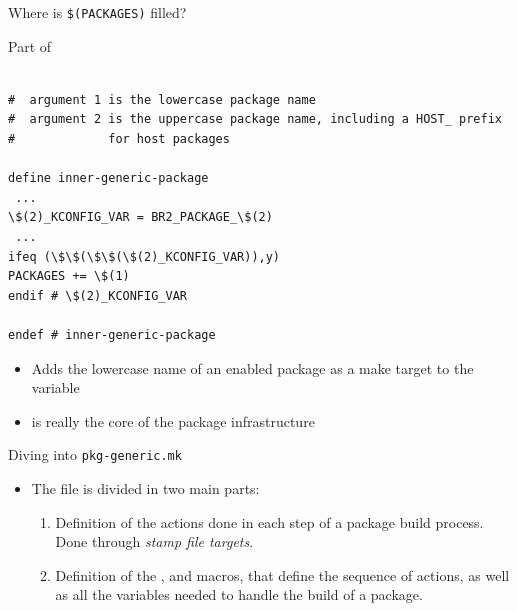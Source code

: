 \begin{frame}[fragile]{Where is {\tt \$(PACKAGES)} filled?}

\begin{block}{Part of }
\begin{verbatim}

#  argument 1 is the lowercase package name
#  argument 2 is the uppercase package name, including a HOST_ prefix
#             for host packages

define inner-generic-package
 ...
\$(2)_KCONFIG_VAR = BR2_PACKAGE_\$(2)
 ...
ifeq (\$\$(\$\$(\$(2)_KCONFIG_VAR)),y)
PACKAGES += \$(1)
endif # \$(2)_KCONFIG_VAR

endef # inner-generic-package
\end{verbatim}
\end{block}

\begin{itemize}
\item Adds the lowercase name of an enabled package as a make target
  to the  variable
\item {} is really the core of the package
  infrastructure
\end{itemize}

\end{frame}

\begin{frame}{Diving into {\tt pkg-generic.mk}}

\begin{itemize}
\item The  file is divided in two main
  parts:
  \begin{enumerate}
  \item Definition of the actions done in each step of a package build
    process. Done through {\em stamp file targets}.
  \item Definition of the ,
     and  macros,
    that define the sequence of actions, as well as all the variables
    needed to handle the build of a package.
  \end{enumerate}
\end{itemize}

\end{frame}

